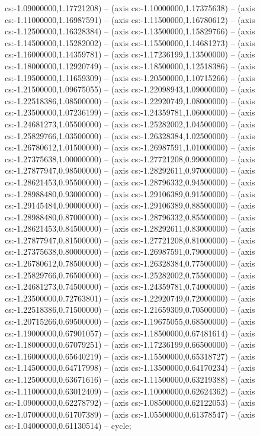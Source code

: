 cs:-1.09000000,1.17721208) -- (axis cs:-1.10000000,1.17375638) -- (axis cs:-1.11000000,1.16987591) -- (axis cs:-1.11500000,1.16780612) -- (axis cs:-1.12500000,1.16328384) -- (axis cs:-1.13500000,1.15829766) -- (axis cs:-1.14500000,1.15282002) -- (axis cs:-1.15500000,1.14681273) -- (axis cs:-1.16000000,1.14359781) -- (axis cs:-1.17236199,1.13500000) -- (axis cs:-1.18000000,1.12920749) -- (axis cs:-1.18500000,1.12518386) -- (axis cs:-1.19500000,1.11659309) -- (axis cs:-1.20500000,1.10715266) -- (axis cs:-1.21500000,1.09675055) -- (axis cs:-1.22098943,1.09000000) -- (axis cs:-1.22518386,1.08500000) -- (axis cs:-1.22920749,1.08000000) -- (axis cs:-1.23500000,1.07236199) -- (axis cs:-1.24359781,1.06000000) -- (axis cs:-1.24681273,1.05500000) -- (axis cs:-1.25282002,1.04500000) -- (axis cs:-1.25829766,1.03500000) -- (axis cs:-1.26328384,1.02500000) -- (axis cs:-1.26780612,1.01500000) -- (axis cs:-1.26987591,1.01000000) -- (axis cs:-1.27375638,1.00000000) -- (axis cs:-1.27721208,0.99000000) -- (axis cs:-1.27877947,0.98500000) -- (axis cs:-1.28292611,0.97000000) -- (axis cs:-1.28621453,0.95500000) -- (axis cs:-1.28796332,0.94500000) -- (axis cs:-1.28988480,0.93000000) -- (axis cs:-1.29106389,0.91500000) -- (axis cs:-1.29145484,0.90000000) -- (axis cs:-1.29106389,0.88500000) -- (axis cs:-1.28988480,0.87000000) -- (axis cs:-1.28796332,0.85500000) -- (axis cs:-1.28621453,0.84500000) -- (axis cs:-1.28292611,0.83000000) -- (axis cs:-1.27877947,0.81500000) -- (axis cs:-1.27721208,0.81000000) -- (axis cs:-1.27375638,0.80000000) -- (axis cs:-1.26987591,0.79000000) -- (axis cs:-1.26780612,0.78500000) -- (axis cs:-1.26328384,0.77500000) -- (axis cs:-1.25829766,0.76500000) -- (axis cs:-1.25282002,0.75500000) -- (axis cs:-1.24681273,0.74500000) -- (axis cs:-1.24359781,0.74000000) -- (axis cs:-1.23500000,0.72763801) -- (axis cs:-1.22920749,0.72000000) -- (axis cs:-1.22518386,0.71500000) -- (axis cs:-1.21659309,0.70500000) -- (axis cs:-1.20715266,0.69500000) -- (axis cs:-1.19675055,0.68500000) -- (axis cs:-1.19000000,0.67901057) -- (axis cs:-1.18500000,0.67481614) -- (axis cs:-1.18000000,0.67079251) -- (axis cs:-1.17236199,0.66500000) -- (axis cs:-1.16000000,0.65640219) -- (axis cs:-1.15500000,0.65318727) -- (axis cs:-1.14500000,0.64717998) -- (axis cs:-1.13500000,0.64170234) -- (axis cs:-1.12500000,0.63671616) -- (axis cs:-1.11500000,0.63219388) -- (axis cs:-1.11000000,0.63012409) -- (axis cs:-1.10000000,0.62624362) -- (axis cs:-1.09000000,0.62278792) -- (axis cs:-1.08500000,0.62122053) -- (axis cs:-1.07000000,0.61707389) -- (axis cs:-1.05500000,0.61378547) -- (axis cs:-1.04000000,0.61130514) -- cycle;

